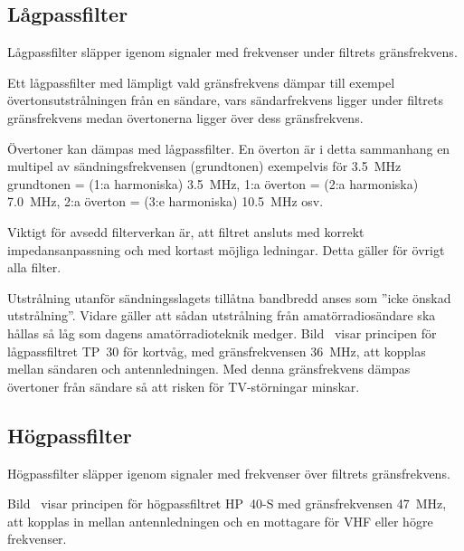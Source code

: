 \subsection{Lågpassfilter}
\label{subsec:laagpassfilter}


Lågpassfilter släpper igenom signaler med frekvenser under filtrets
gränsfrekvens.

Ett lågpassfilter med lämpligt vald gränsfrekvens dämpar till exempel
övertonsutstrålningen från en sändare, vars sändarfrekvens ligger under filtrets
gränsfrekvens medan övertonerna ligger över dess gränsfrekvens.

Övertoner kan dämpas med lågpassfilter.
En överton är i detta sammanhang en multipel av sändningsfrekvensen
(grundtonen) exempelvis för
\qty{3,5}{\mega\hertz} grundtonen = (1:a harmoniska) \qty{3,5}{\mega\hertz},
1:a överton = (2:a harmoniska) \qty{7,0}{\mega\hertz},
2:a överton = (3:e harmoniska) \qty{10,5}{\mega\hertz} osv.

Viktigt för avsedd filterverkan är, att filtret ansluts med korrekt
impedansanpassning och med kortast möjliga ledningar.
Detta gäller för övrigt alla filter.

Utstrålning utanför sändningsslagets tillåtna bandbredd anses som
''icke önskad utstrålning''.
Vidare gäller att sådan utstrålning från amatörradiosändare ska hållas så låg
som dagens amatörradioteknik medger.
Bild~ visar principen för lågpassfiltret TP~30 för kortvåg,
med gränsfrekvensen \qty{36}{\mega\hertz}, att kopplas mellan sändaren och
antennledningen.
Med denna gränsfrekvens dämpas övertoner från sändare så att risken för
TV-störningar minskar.


\subsection{Högpassfilter}
\label{subsec:hoegpassfilter}

Högpassfilter släpper igenom signaler med frekvenser över filtrets
gränsfrekvens.

Bild~ visar principen för högpassfiltret HP~40-S med
gränsfrekvensen \qty{47}{\mega\hertz}, att kopplas in mellan antennledningen och
en mottagare för VHF eller högre frekvenser.


